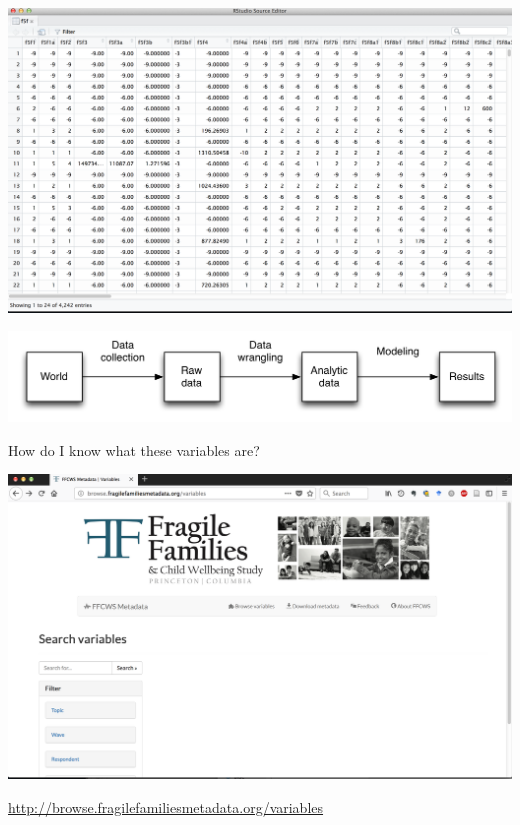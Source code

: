 \documentclass{beamer}
\begin{document}
\begin{frame}

\begin{center}
\includegraphics[width=\textwidth]{figures/ffc_rawdata_f5f}
\end{center}

\end{frame}
\begin{frame}

\begin{center}
\includegraphics[width=\textwidth]{figures/scientific_pipeline}
\end{center}

\end{frame}
\begin{frame}

How do I know what these variables are? 

\begin{center}
\includegraphics[width=\textwidth]{figures/ff_metadata_browser}
\end{center}

\vfill

\url{http://browse.fragilefamiliesmetadata.org/variables}

\end{frame}
\end{document}

